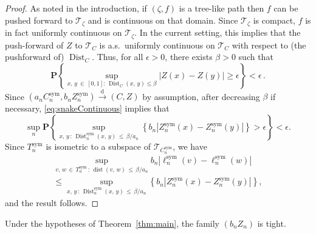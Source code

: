 \documentclass[10pt]{amsart}
\theoremstyle{definition}\newtheorem{defi}[theo]{Definition}\newtheorem{rema}[theo]{Remark}\newtheorem{exam}[theo]{Example}\newtheorem{exem}[theo]{Example}\newtheorem{nota}[theo]{Notation}
\newcommand{\cT}{\mathcal{T}}
\DeclareMathOperator{\sym}{sym}
\DeclareMathOperator{\dist}{dist}
\DeclareMathOperator{\Dist}{Dist}
\newcommand{\p}[1]{\mathbf{P}\left\{#1\right\}}
\providecommand{\eps}{}
\renewcommand{\eps}{\epsilon}
\newcommand{\convdist}{\ensuremath{\stackrel{\mathrm{d}}{\rightarrow}}}
\begin{document}
\begin{proof}
As noted in the introduction, if $(\zeta,f)$ is a tree-like path then $f$ can be pushed forward to $\cT_\zeta$ and is continuous on that domain. Since $\cT_\zeta$ is compact, $f$ is in fact uniformly continuous on $\cT_\zeta$. In the current setting, this implies that the push-forward of $Z$ to $\cT_C$ is a.s.\ uniformly continuous on $\cT_C$ with respect to (the pushforward of) $\Dist_C$. Thus, for all $\epsilon>0$, there exists $\beta>0$ such that
\begin{equation}\label{eq:snakeContinuous}
\p{\sup_{x,\,y\:\in\,[0,1]:\,\Dist_C(x,\,y) \le \beta} \left|Z(x)-Z(y)\right| \ge \eps} < \eps\,.
\end{equation}
Since $(a_nC_n^{\sym},b_nZ_n^{\sym}) \convdist (C,Z)$ by assumption, after decreasing $\beta$ if necessary, \eqref{eq:snakeContinuous} implies that
\[
\sup_n\p{\sup_{x,\,y\,:\,\Dist_n^{\sym}(x,\,y)\,\le\,\beta/a_n}\left\{b_n\left|Z_n^{\sym}(x)-Z_n^{\sym}(y)\right|\right\}>\eps}<\eps.
\]
Since $T_n^{\sym}$ is isometric to a subspace of $\cT_{C_n^{\sym}}$, we have
\begin{multline*}
\sup_{v,\,w\,\in\,T_n^{\sym}\,:\,\dist(v,\,w)\,\le\,\beta/a_n} b_n \left|\ell^{\sym}_n(v) -\ell^{\sym}_n(w)\right|
\\
\le \sup_{x,\,y\,:\, \Dist_n^{\sym}(x,\,y)\,\le\,\beta/a_n}\left\{b_n\left|Z_n^{\sym}(x)-Z_n^{\sym}(y)\right|\right\},
\end{multline*}
and the result follows.
\end{proof}

\begin{prop}\label{prop:tightness}
Under the hypotheses of Theorem~\ref{thm:main}, the family $(b_nZ_n)$ is tight.
\end{prop}
\end{document}
